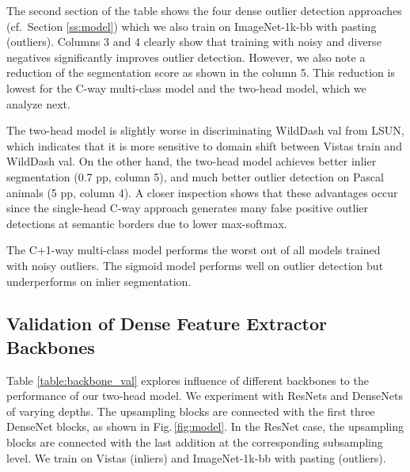\documentclass[runningheads]{llncs}
\begin{document}
The second section of the table shows 
the four dense outlier detection approaches
(cf.\ Section \ref{ss:model})
which we also train on 
ImageNet-1k-bb with pasting (outliers).
Columns 3 and 4 clearly show
that training with noisy and diverse negatives
significantly improves outlier detection. 
However, we also note a reduction 
of the segmentation score 
as shown in the column 5.
This reduction is lowest for 
the C-way multi-class model 
and the two-head model,
which we analyze next.

The two-head model is slightly worse
in discriminating WildDash val from LSUN,
which indicates that it is
more sensitive to domain shift
between Vistas train and WildDash val.
On the other hand, the two-head model achieves 
better inlier segmentation
(0.7 pp, column 5),
and much better outlier detection
on Pascal animals (5 pp, column 4).
A closer inspection shows 
that these advantages occur
since the single-head C-way approach
generates many false positive
outlier detections at semantic borders
due to lower max-softmax.

The C+1-way multi-class model performs the worst 
out of all models trained with noisy outliers.
The sigmoid model performs 
well on outlier detection
but underperforms on inlier segmentation.



\subsection{Validation of Dense 
  Feature Extractor Backbones}

Table \ref{table:backbone_val} explores 
influence of different backbones
to the performance of our two-head model. 
We experiment with ResNets and 
DenseNets of varying depths.
The upsampling blocks are connected 
with the first three DenseNet blocks,
as shown in Fig.\,\ref{fig:model}.
In the ResNet case, the upsampling blocks 
are connected with the last addition
at the corresponding subsampling level.
We train on Vistas (inliers) 
and ImageNet-1k-bb with pasting (outliers).
\end{document}
